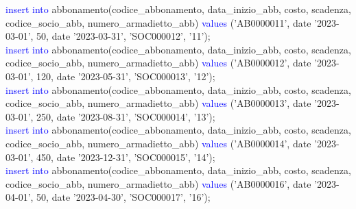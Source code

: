 \documentclass{article}
\begin{document}
\begin{flushleft}
{        \hspace*{0.5em}\textcolor{blue}{insert into} abbonamento(codice\_abbonamento, data\_inizio\_abb, costo, scadenza, \hspace*{0.5em}codice\_socio\_abb, numero\_armadietto\_abb) \textcolor{blue}{values} ('AB0000011', date '2023-03-01', \hspace*{0.5em}50, date '2023-03-31', 'SOC000012', '11'); \\
        \vspace{2mm}
        \hspace*{0.5em}\textcolor{blue}{insert into} abbonamento(codice\_abbonamento, data\_inizio\_abb, costo, scadenza, \hspace*{0.5em}codice\_socio\_abb, numero\_armadietto\_abb) \textcolor{blue}{values} ('AB0000012', date '2023-03-01', \hspace*{0.5em}120, date '2023-05-31', 'SOC000013', '12'); \\
        \vspace{2mm}
        \hspace*{0.5em}\textcolor{blue}{insert into} abbonamento(codice\_abbonamento, data\_inizio\_abb, costo, scadenza, \hspace*{0.5em}codice\_socio\_abb, numero\_armadietto\_abb) \textcolor{blue}{values} ('AB0000013', date '2023-03-01', \hspace*{0.5em}250, date '2023-08-31', 'SOC000014', '13'); \\
        \vspace{2mm}
        \hspace*{0.5em}\textcolor{blue}{insert into} abbonamento(codice\_abbonamento, data\_inizio\_abb, costo, scadenza, \hspace*{0.5em}codice\_socio\_abb, numero\_armadietto\_abb) \textcolor{blue}{values} ('AB0000014', date '2023-03-01', \hspace*{0.5em}450, date '2023-12-31', 'SOC000015', '14'); \\
        \vspace{2mm}
        \hspace*{0.5em}\textcolor{blue}{insert into} abbonamento(codice\_abbonamento, data\_inizio\_abb, costo, scadenza, \hspace*{0.5em}codice\_socio\_abb, numero\_armadietto\_abb) \textcolor{blue}{values} ('AB0000016', date '2023-04-01', \hspace*{0.5em}50, date '2023-04-30', 'SOC000017', '16'); \\
        \vspace{2mm}
}
\end{flushleft}
\end{document}
